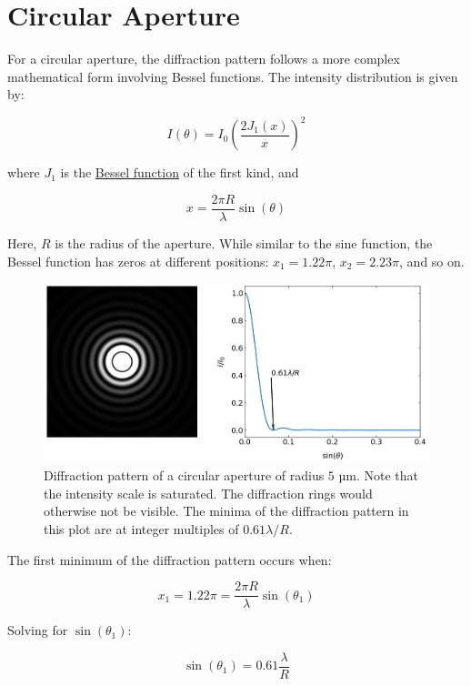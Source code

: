 \documentclass[
  a4paper,
]{book}
\begin{document}
\section{Circular Aperture}\label{circular-aperture}

For a circular aperture, the diffraction pattern follows a more complex
mathematical form involving Bessel functions. The intensity distribution
is given by:

\[
I(\theta)=I_0\left( \frac{2J_1(x)}{x} \right )^2
\]

where \(J_1\) is the
\href{https://en.wikipedia.org/wiki/Bessel_function}{Bessel function} of
the first kind, and

\[
x=\frac{2\pi R}{\lambda}\sin(\theta)
\]

Here, \(R\) is the radius of the aperture. While similar to the sine
function, the Bessel function has zeros at different positions:
\(x_1=1.22\pi\), \(x_2=2.23\pi\), and so on.

\begin{figure}[H]

{\centering \includegraphics[width=0.9\linewidth,height=\textheight,keepaspectratio]{wave-optics/img/circ_ap.png}

}

\caption{Diffraction pattern of a circular aperture of radius \(5\) µm.
Note that the intensity scale is saturated. The diffraction rings would
otherwise not be visible. The minima of the diffraction pattern in this
plot are at integer multiples of \(0.61\lambda/R\).}

\end{figure}%

The first minimum of the diffraction pattern occurs when:

\[
x_1=1.22\pi=\frac{2\pi R}{\lambda}\sin(\theta_1)
\]

Solving for \(\sin(\theta_1)\):

\[
\sin(\theta_1)=0.61\frac{\lambda}{R}
\]
\end{document}
